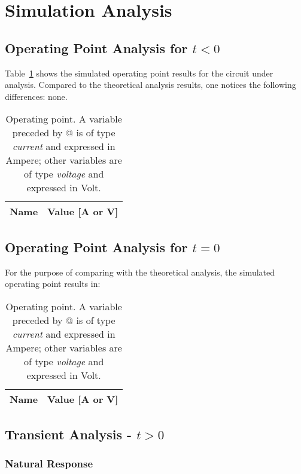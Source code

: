 \section{Simulation Analysis}
\label{sec:simulation}

\subsection{Operating Point Analysis for $t<0$}

Table~\ref{tab:op} shows the simulated operating point results for the circuit
under analysis. Compared to the theoretical analysis results, one notices the
following differences: none.

\begin{table}[h]
  \centering
  \begin{tabular}{|l|r|}
    \hline
    {\bf Name} & {\bf Value [A or V]} \\ \hline
    
  \end{tabular}
  \caption{Operating point. A variable preceded by @ is of type {\em current}
    and expressed in Ampere; other variables are of type {\it voltage} and expressed in
    Volt.}
  \label{tab:op}
\end{table}

\subsection{Operating Point Analysis for $t=0$}

For the purpose of comparing with the theoretical analysis, the simulated operating point results in:

\begin{table}[h]
  \centering
  \begin{tabular}{|l|r|}
    \hline
    {\bf Name} & {\bf Value [A or V]} \\ \hline
    
  \end{tabular}
  \caption{Operating point. A variable preceded by @ is of type {\em current}
    and expressed in Ampere; other variables are of type {\it voltage} and expressed in
    Volt.}
  \label{tab:op2}
\end{table}




\subsection{Transient Analysis - $t>0$}
\subsubsection{Natural Response}

